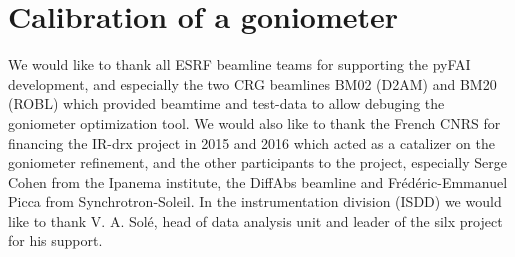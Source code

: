 \documentclass{iucr}              %
\begin{document}
\section{Calibration of a goniometer}



We would like to thank all ESRF beamline teams for supporting the
pyFAI development, and especially the two CRG beamlines BM02 (D2AM) and BM20
(ROBL) which provided beamtime and test-data to allow debuging the goniometer
optimization tool.
We would also like to thank the French CNRS for financing the IR-drx project in
2015 and 2016 which acted as a catalizer on the goniometer refinement,
and the other participants to the project, especially Serge Cohen from the
Ipanema institute, the DiffAbs beamline and Frédéric-Emmanuel Picca from
Synchrotron-Soleil.
In the instrumentation division (ISDD) we would like to thank V. A. Solé,  head
of data analysis unit and leader of the silx project for his support.
\end{document}

